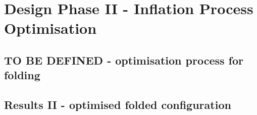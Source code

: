 \chapter{Design Phase II - Inflation Process Optimisation}
\label{chapter-Phase2}

\section{TO BE DEFINED - optimisation process for folding}

\section{Results II - optimised folded configuration}